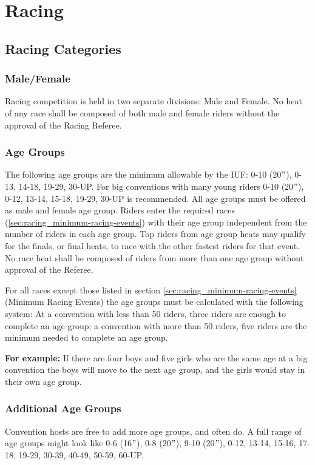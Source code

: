 \chapter{Racing \label{chap:racing}}

\section{Racing Categories}

\subsection{Male/Female}
Racing competition is held in two separate divisions: Male and Female.
No heat of any race shall be composed of both male and female riders without the approval of the Racing Referee.

\subsection{Age Groups \label{subsec:racing_racing-categories_age-groups}}
The following age groups are the minimum allowable by the IUF: 0-10 (20$"$), 0-13, 14-18, 19-29, 30-UP.
For big conventions with many young riders 0-10 (20$"$), 0-12, 13-14, 15-18, 19-29, 30-UP is recommended.
All age groups must be offered as male and female age group.
Riders enter the required races (\ref{sec:racing_minimum-racing-events}) with their age group independent from the number of riders in each age group.
Top riders from age group heats may qualify for the finals, or final heats, to race with the other fastest riders for that event.
No race heat shall be composed of riders from more than one age group without approval of the Referee.

For all races except those listed in section \ref{sec:racing_minimum-racing-events} (Minimum Racing Events) the age groups must be calculated with the following system: At a convention with less than 50 riders, three riders are enough to complete an age group; a convention with more than 50 riders, five riders are the minimum needed to complete an age group.

\textbf{For example:} If there are four boys and five girls who are the same age at a big convention the boys will move to the next age group, and the girls would stay in their own age group.

\subsection{Additional Age Groups}
Convention hosts are free to add more age groups, and often do.
A full range of age groups might look like 0-6 (16$"$), 0-8 (20$"$), 9-10 (20$"$), 0-12, 13-14, 15-16, 17-18, 19-29, 30-39, 40-49, 50-59, 60-UP.

